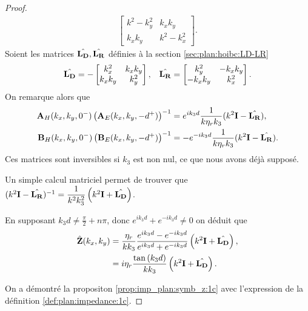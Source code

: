 \begin{proof}
\begin{align*}
            \begin{bmatrix}
              k^2 - k_y^2 & k_x k_y
              \\
              k_x k _y & k^2 - k_x^2
            \end{bmatrix}.
          \end{align*}
          Soient les matrices \(\hat{\mathbf{L_D}},\hat{\mathbf{L_R}}\) définies à la section \ref{sec:plan:hoibc:LD-LR}
          \begin{align*}
            \hat{\mathbf{L_D}} = -\begin{bmatrix}
            k_x^2 & k_x k_y
            \\
            k_x k _y & k_y^2
            \end{bmatrix},
            & & 
            \hat{\mathbf{L_R}} = \begin{bmatrix}
            k_y^2 & -k_x k_y
            \\
            -k_x k _y &  k_x^2
            \end{bmatrix}.
          \end{align*}
          On remarque alors que 
          \begin{align*}
            \mathbf{A}_H(k_x,k_y,0^-)\left(\mathbf{A}_E(k_x,k_y,-d^+)\right)^{-1} &=  e^{ik_3d}\dfrac{1}{k\eta_r k_3}(k^2\mathbf{I}  -\hat{\mathbf{L_R}}),
            \\
            \mathbf{B}_H(k_x,k_y,0^-)\left(\mathbf{B}_E(k_x,k_y,-d^+)\right)^{-1} &= -e^{-ik_3d}\dfrac{1}{k\eta_r k_3}(k^2\mathbf{I}  -\hat{\mathbf{L_R}}).
          \end{align*}
          Ces matrices sont inversibles si \(k_3\) est non nul, ce que nous avons déjà supposé.

          Un simple calcul matriciel permet de trouver que \( (k^2\mathbf{I} - \hat{\mathbf{L_R}})^{-1} = \dfrac{1}{k^2k_3^2}\left(k^2 \mathbf{I} + \hat{\mathbf{L_D}}\right) \).

          En supposant \(k_3d \not = \frac{\pi}{2} + n\pi\), donc \(e^{ik_3d}+e^{-ik_3d}\not=0\) on déduit que
          \begin{align*}
            \hat {\mathbf{Z}}(k_x,k_y) &= \dfrac{\eta_r}{k k_3} \dfrac{e^{ik_3d} - e^{-ik_3d}}{e^{ik_3d} + e^{-ik_3d}}\left(k^2\mathbf{I} + \hat{\mathbf{L_D}}\right),
            \\
            &= i\eta_r\dfrac{\tan\left(k_3d\right)}{k k_3}\left(k^2\mathbf{I} + \hat{\mathbf{L_D}}\right).
          \end{align*}

          On a démontré la propositon \ref{prop:imp_plan:symb_z:1c} avec l'expression de la définition \ref{def:plan:impedance:1c}.
        \end{proof}

